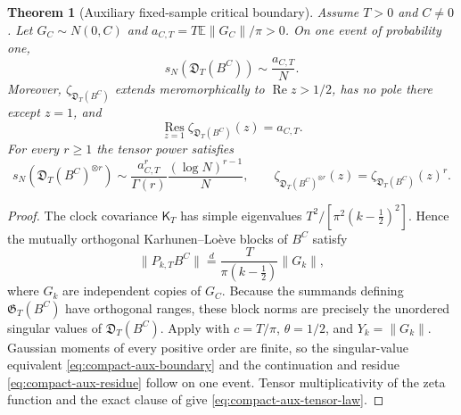 \documentclass[10pt,reqno]{amsart}
\theoremstyle{plain}
\newtheorem{theorem}{Theorem}[section]
\theoremstyle{definition}
\theoremstyle{remark}
\begin{document}
\begin{theorem}[Auxiliary fixed-sample critical boundary]
\label{thm:compact-brownian-auxiliary-boundary}
Assume $T>0$ and $C\ne0$.  Let $G_C\sim N(0,C)$ and
$a_{C,T}=T\mathbb E\|G_C\|/\pi>0$.  On one event of probability one,
\begin{equation}
 s_N(\mathfrak D_T(B^C))\sim\frac{a_{C,T}}{N}.
 \label{eq:compact-aux-boundary}
\end{equation}
Moreover, $\zeta_{\mathfrak D_T(B^C)}$ extends meromorphically to
$\operatorname{Re}z>1/2$, has no pole there except $z=1$, and
\begin{equation}
 \operatorname*{Res}_{z=1}\zeta_{\mathfrak D_T(B^C)}(z)=a_{C,T}.
 \label{eq:compact-aux-residue}
\end{equation}
For every $r\ge1$ the tensor power satisfies
\begin{equation}
 s_N\!\left(\mathfrak D_T(B^C)^{\otimes r}\right)
 \sim\frac{a_{C,T}^r}{\Gamma(r)}
       \frac{(\log N)^{r-1}}{N},
 \qquad
 \zeta_{\mathfrak D_T(B^C)^{\otimes r}}(z)
 =\zeta_{\mathfrak D_T(B^C)}(z)^r.
 \label{eq:compact-aux-tensor-law}
\end{equation}
\end{theorem}

\begin{proof}
The clock covariance $\mathsf K_T$ has simple eigenvalues
$T^2/[\pi^2(k-\frac12)^2]$.  Hence the mutually orthogonal
Karhunen--Lo\`eve blocks of $B^C$ satisfy
\[
 \|P_{k,T}B^C\|
 \stackrel{d}=\frac{T}{\pi(k-\frac12)}\|G_k\|,
\]
where $G_k$ are independent copies of $G_C$.  Because the summands defining
$\mathfrak G_T(B^C)$ have orthogonal ranges, these block norms are precisely
the unordered singular values of $\mathfrak D_T(B^C)$.  Apply
 with
$c=T/\pi$, $\theta=1/2$, and $Y_k=\|G_k\|$.  Gaussian moments of every
positive order are finite, so the singular-value equivalent
\eqref{eq:compact-aux-boundary} and the continuation and residue
\eqref{eq:compact-aux-residue} follow on one event.  Tensor
multiplicativity of the zeta function and the exact clause of
 give
\eqref{eq:compact-aux-tensor-law}.
\end{proof}
\end{document}
